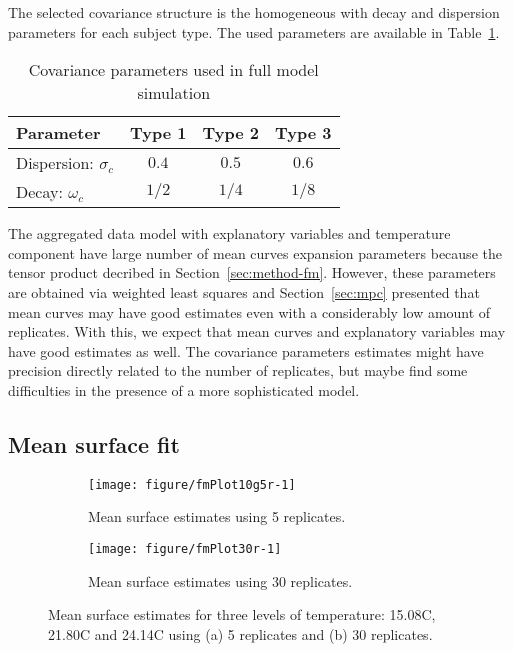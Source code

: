  The selected covariance structure is the homogeneous with decay and dispersion parameters for each subject type. The used parameters are available in Table~\ref{tab:fm-pars}.

\begin{table}[t]
  \centering
  \caption[fm]{Covariance parameters used in full model simulation}
  \begin{tabular}[lccc]{lccc}
    \toprule
    Parameter & Type 1 & Type 2 & Type 3 \\
    \midrule
    Dispersion: $\sigma_c$ & $0.4$ & $0.5$ & $0.6$ \\
    Decay: $\omega_c$ & $1/2$ & $1/4$ & $1/8$ \\
    \bottomrule
  \end{tabular}
  \label{tab:fm-pars}
\end{table}


The aggregated data model with explanatory variables and temperature component have large number of mean curves expansion parameters because the tensor product decribed in Section~\ref{sec:method-fm}. However, these parameters are obtained via weighted least squares and Section~\ref{sec:mpc} presented that mean curves may have good estimates even with a considerably low amount of replicates. With this, we expect that mean curves and explanatory variables may have good estimates as well. The covariance parameters estimates might have precision directly related to the number of replicates, but maybe find some difficulties in the presence of a more sophisticated model.




\subsection{Mean surface fit}
\label{sec:fm-fit}




\begin{figure}[t]
  \centering
  \begin{subfigure}{\textwidth}
    \centering
\begin{knitrout}
\color{fgcolor}
\texttt{[image: figure/fmPlot10g5r-1]} 

\end{knitrout}
    \label{fig:fm-fit6rep}
    \caption{Mean surface estimates using 5 replicates.}
  \end{subfigure}
  \begin{subfigure}{\textwidth}
    \centering
\begin{knitrout}
\color{fgcolor}
\texttt{[image: figure/fmPlot30r-1]} 

\end{knitrout}
    \label{fig:fm-fit30rep}
  \caption{Mean surface estimates using 30 replicates.}
  \end{subfigure}
    \caption{Mean surface estimates for three levels of temperature: 15.08\textdegree C, 21.80\textdegree C and 24.14\textdegree C using (a) 5 replicates and (b) 30 replicates.}
  \label{fig:fm-fit}
\end{figure}



